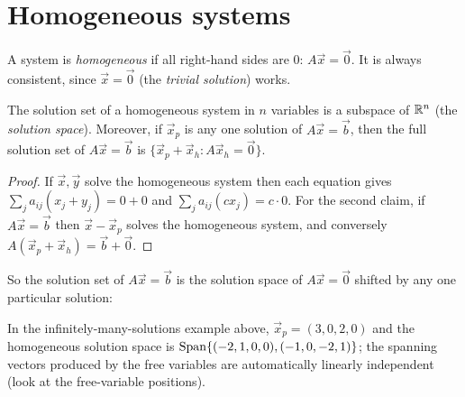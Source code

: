 \section{Homogeneous systems}

\begin{definition}
A system is \emph{homogeneous} if all right-hand sides are $0$: $A\vec x=\vec 0$. It is always
consistent, since $\vec x=\vec 0$ (the \emph{trivial solution}) works.
\end{definition}

\begin{theorem}
The solution set of a homogeneous system in $n$ variables is a subspace of $\mathbb{R}^n$ (the
\emph{solution space}). Moreover, if $\vec x_p$ is any one solution of $A\vec x=\vec b$, then the
full solution set of $A\vec x=\vec b$ is $\{\vec x_p+\vec x_h : A\vec x_h=\vec 0\}$.
\end{theorem}
\begin{proof}
If $\vec x,\vec y$ solve the homogeneous system then each equation gives
$\sum_j a_{ij}(x_j+y_j)=0+0$ and $\sum_ja_{ij}(cx_j)=c\cdot0$. For the second claim, if
$A\vec x=\vec b$ then $\vec x-\vec x_p$ solves the homogeneous system, and conversely
$A(\vec x_p+\vec x_h)=\vec b+\vec 0$.
\end{proof}

So the solution set of $A\vec x = \vec b$ is the solution space of $A\vec x=\vec 0$ shifted by
any one particular solution:
\begin{center}
\end{center}

In the infinitely-many-solutions example above, $\vec x_p=(3,0,2,0)$ and the homogeneous
solution space is $\operatorname{Span}\{(-2,1,0,0),(-1,0,-2,1)\}$; the spanning vectors produced by the
free variables are automatically linearly independent (look at the free-variable positions).

